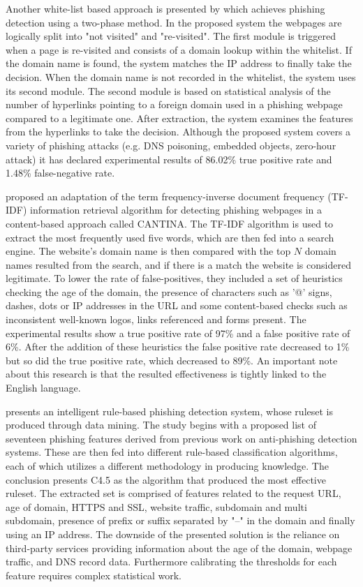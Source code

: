 Another white-list based approach is presented by
\cite{ANTIPHISHING_AUTOUPDATED_WHITELIST} which achieves phishing detection
using a two-phase method. In the proposed system the webpages are logically
split into "not visited" and "re-visited". The first module is triggered when a
page is re-visited and consists of a domain lookup within the whitelist. If the
domain name is found, the system matches the IP address to finally take the
decision. When the domain name is not recorded in the whitelist, the system uses
its second module. The second module is based on statistical analysis of the
number of hyperlinks pointing to a foreign domain used in a phishing webpage
compared to a legitimate one. After extraction, the system examines the features
from the hyperlinks to take the decision. Although the proposed system covers a
variety of phishing attacks (e.g. DNS poisoning, embedded objects, zero-hour
attack) it has declared experimental results of 86.02\% true positive rate and
1.48\% false-negative rate.

\cite{CANTINA} proposed an adaptation of the term frequency-inverse document
frequency (TF-IDF) information retrieval algorithm for detecting phishing
webpages in a content-based approach called CANTINA. The TF-IDF algorithm is
used to extract the most frequently used five words, which are then fed into a
search engine. The website's domain name is then compared with the top \(N\)
domain names resulted from the search, and if there is a match the website is
considered legitimate.
To lower the rate of false-positives, they included a set of heuristics checking
the age of the domain, the presence of characters such as '@' signs, dashes,
dots or IP addresses in the URL and some content-based checks such as
inconsistent well-known logos, links referenced and forms present. The
experimental results show a true positive rate of 97\% and a false positive rate
of 6\%. After the addition of these heuristics the false positive rate decreased
to 1\% but so did the true positive rate, which decreased to 89\%. An important
note about this research is that the resulted effectiveness is tightly linked to
the English language.

\cite{RULE_BASED_CLASSIFICATION} presents an intelligent rule-based phishing
detection system, whose ruleset is produced through data mining. The study
begins with a proposed list of seventeen phishing features derived from previous
work on anti-phishing detection systems. These are then fed into different
rule-based classification algorithms, each of which utilizes a different
methodology in producing knowledge. The conclusion presents C4.5 \citep{C4.5} as
the algorithm that produced the most effective ruleset. The extracted set is
comprised of features related to the request URL, age of domain, HTTPS and SSL,
website traffic, subdomain and multi subdomain, presence of prefix or suffix
separated by "--" in the domain and finally using an IP address. The downside of
the presented solution is the reliance on third-party services providing
information about the age of the domain, webpage traffic, and DNS record data.
Furthermore calibrating the thresholds for each feature requires complex
statistical work.

